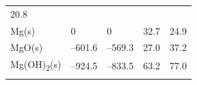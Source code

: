 \documentclass[
  9pt,
]{extbook}
\theoremstyle{definition}
\theoremstyle{definition}
\theoremstyle{definition}
\theoremstyle{remark}
\begin{document}
\begin{longtable}[]{@{}lllll@{}}
\begin{minipage}[t]{0.18\columnwidth}
20.8\strut
\end{minipage}\tabularnewline
\begin{minipage}[t]{0.10\columnwidth}\raggedright
Mg(s)\strut
\end{minipage} & \begin{minipage}[t]{0.19\columnwidth}\raggedright
0\strut
\end{minipage} & \begin{minipage}[t]{0.20\columnwidth}\raggedright
0\strut
\end{minipage} & \begin{minipage}[t]{0.18\columnwidth}\raggedright
32.7\strut
\end{minipage} & \begin{minipage}[t]{0.18\columnwidth}\raggedright
24.9\strut
\end{minipage}\tabularnewline
\begin{minipage}[t]{0.10\columnwidth}\raggedright
MgO(s)\strut
\end{minipage} & \begin{minipage}[t]{0.19\columnwidth}\raggedright
--601.6\strut
\end{minipage} & \begin{minipage}[t]{0.20\columnwidth}\raggedright
--569.3\strut
\end{minipage} & \begin{minipage}[t]{0.18\columnwidth}\raggedright
27.0\strut
\end{minipage} & \begin{minipage}[t]{0.18\columnwidth}\raggedright
37.2\strut
\end{minipage}\tabularnewline
\begin{minipage}[t]{0.10\columnwidth}\raggedright
Mg(OH)\textsubscript{2}(s)\strut
\end{minipage} & \begin{minipage}[t]{0.19\columnwidth}\raggedright
--924.5\strut
\end{minipage} & \begin{minipage}[t]{0.20\columnwidth}\raggedright
--833.5\strut
\end{minipage} & \begin{minipage}[t]{0.18\columnwidth}\raggedright
63.2\strut
\end{minipage} & \begin{minipage}[t]{0.18\columnwidth}\raggedright
77.0\strut
\end{minipage}\tabularnewline
\begin{minipage}[t]{0.10\columnwidth}\raggedright

\end{minipage}
\end{longtable}
\end{document}
